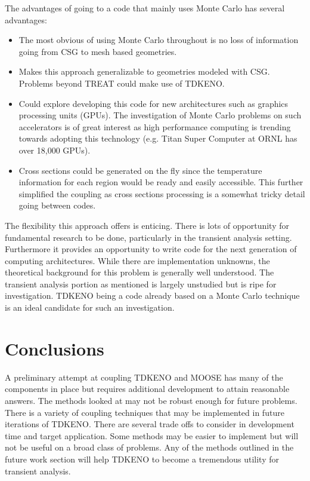 \documentclass[11pt]{article}
\begin{document}
The advantages of going to a code that mainly uses Monte Carlo has several advantages:
	\begin{itemize}
	\item The most obvious  of using Monte Carlo throughout is no loss of information going from CSG to mesh based geometries. 
	\item Makes this approach generalizable to geometries modeled with CSG. Problems beyond TREAT could make use of TDKENO.  
	\item Could explore developing this code for new architectures such as graphics processing units (GPUs).  The investigation of Monte Carlo problems on such accelerators is of great interest as  high performance computing is trending towards adopting this technology (e.g. Titan Super Computer at ORNL has over 18,000 GPUs). 
	\item Cross sections could be generated on the fly since the temperature information for each region would be ready and easily accessible.  This further simplified the coupling as cross sections processing is a somewhat tricky detail going between codes. 
	\end{itemize}

The flexibility this approach offers is enticing.  There is lots of opportunity for fundamental research to be done, particularly in the transient analysis setting.  Furthermore it provides an opportunity to write code for the next generation of computing architectures.  While there are implementation unknowns, the theoretical background for this problem is generally well understood. The transient analysis portion as mentioned is largely unstudied but is ripe for investigation.  TDKENO being a code already based on a Monte Carlo technique is an ideal candidate for such an investigation.


\section{Conclusions}

A preliminary attempt at coupling TDKENO and MOOSE has many of the components in place but  requires additional development to attain reasonable answers.  The methods looked at may not be robust enough for future problems.  There is a variety of coupling techniques that may be implemented in future iterations of TDKENO.  There are several trade offs to consider in development time and target application.  Some methods may be easier to implement but will not be useful on a broad class of problems.  Any of the methods outlined in the future work section will help TDKENO to become a tremendous utility for transient analysis. 
\end{document}
